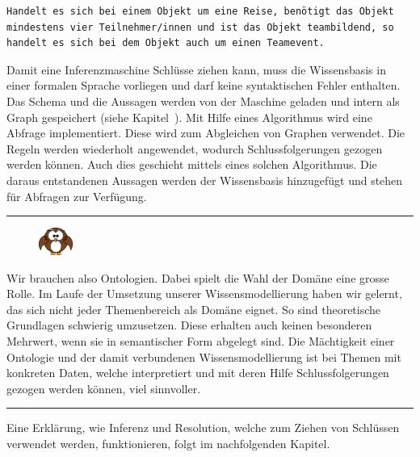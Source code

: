 \begin{lstlisting}[caption={Beispiel einer Regel in einer Wissensbasis.}]
Handelt es sich bei einem Objekt um eine Reise, benötigt das Objekt mindestens vier Teilnehmer/innen und ist das Objekt teambildend, so handelt es sich bei dem Objekt auch um einen Teamevent.
\end{lstlisting}

Damit eine Inferenzmaschine Schlüsse ziehen kann, muss die Wissensbasis in einer formalen Sprache vorliegen und darf keine syntaktischen Fehler enthalten. Das Schema und die Aussagen werden von der Maschine geladen und intern als Graph gespeichert (siehe Kapitel~). Mit Hilfe eines Algorithmus wird eine Abfrage implementiert. Diese wird zum Abgleichen von Graphen verwendet. Die Regeln werden wiederholt angewendet, wodurch Schlussfolgerungen gezogen werden können. Auch dies geschieht mittels eines solchen Algorithmus. Die daraus entstandenen Aussagen werden der Wissensbasis hinzugefügt und stehen für Abfragen zur Verfügung.

\noindent\rule[1ex]{\textwidth}{1pt}
\begin{figure}
    \vspace{-2pt}
    \includegraphics[width=0.1\textwidth]{bilder/owl.png}
\end{figure}
Wir brauchen also Ontologien. Dabei spielt die Wahl der Domäne eine grosse Rolle. Im Laufe der Umsetzung unserer Wissensmodellierung haben wir gelernt, das sich nicht jeder Themenbereich als Domäne eignet. So sind theoretische Grundlagen schwierig umzusetzen. Diese erhalten auch keinen besonderen Mehrwert, wenn sie in semantischer Form abgelegt sind. Die Mächtigkeit einer Ontologie und der damit verbundenen Wissensmodellierung ist bei Themen mit konkreten Daten, welche interpretiert und mit deren Hilfe Schlussfolgerungen gezogen werden können, viel sinnvoller.
\noindent\rule[1ex]{\textwidth}{1pt}

Eine Erklärung, wie Inferenz und Resolution, welche zum Ziehen von Schlüssen verwendet werden, funktionieren, folgt im nachfolgenden Kapitel.
